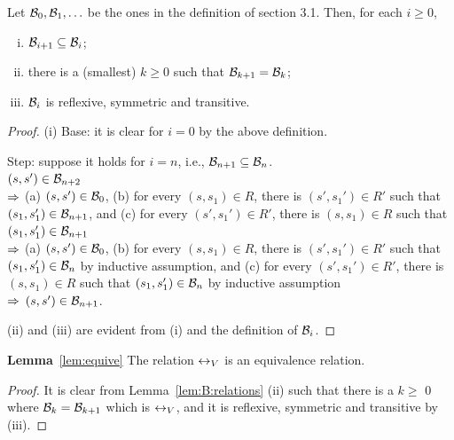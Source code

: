 \documentclass[letterpaper]{article} %
\begin{document}
\begin{lemma}\label{lem:B:relations}
  Let  ${\cal B}_0, {\cal B}_1,\ldots$ be the ones in the definition of section 3.1.
   Then,  for each $i\ge 0$,
   \begin{enumerate}[(i)]
     \item ${\cal B}_{i+1}\subseteq {\cal B}_i$;
     \item there is a (smallest) $k\ge 0$ such that ${\cal B}_{k+1}={\cal B}_k$;
     \item ${\cal B}_i$ is reflexive, symmetric and transitive.
   \end{enumerate}
\end{lemma}
\begin{proof}
  (i)
  Base: it is clear for $i=0$ by the above definition.

  Step: suppose it holds for $i=n$, i.e., ${\cal B}_{n+1}\subseteq{\cal B}_n$. \\
  $(s,s')\in{\cal B}_{n+2}$\\
  $\Rightarrow$ (a) $(s,s')\in  {\cal B}_0$,
    (b) for every $(s,s_1)\in R$, there is $(s',s_1')\in R'$
     such that $(s_1,s_1')\in {\cal B}_{n+1}$, and
    (c)  for every $(s',s_1')\in R'$, there is $(s,s_1)\in R$
    such that $(s_1,s_1')\in {\cal B}_{n+1}$\\
  $\Rightarrow$ (a) $(s,s')\in  {\cal B}_0$,
   (b) for every $(s,s_1)\in R$, there is $(s',s_1')\in R'$
     such that $(s_1,s_1')\in {\cal B}_{n}$ by inductive assumption, and
   (c)  for every $(s',s_1')\in R'$, there is $(s,s_1)\in R$
    such that $(s_1,s_1')\in {\cal B}_{n}$ by inductive assumption\\
  $\Rightarrow$ $(s,s')\in {\cal B}_{n+1}$.

  (ii) and (iii) are evident from (i) and the definition of ${\cal B}_i$.
\end{proof}


\noindent\textbf{Lemma}~\ref{lem:equive}  The relation $\leftrightarrow_V$ is an equivalence relation.\\
\begin{proof}
It is clear from Lemma~\ref{lem:B:relations} (ii) such that there is a $k \geq $ 0 where ${\cal B}_k = {\cal B}_{k+1}$ which is  $\leftrightarrow_V$, and it is reflexive, symmetric and transitive by (iii).
\end{proof}
\end{document}
